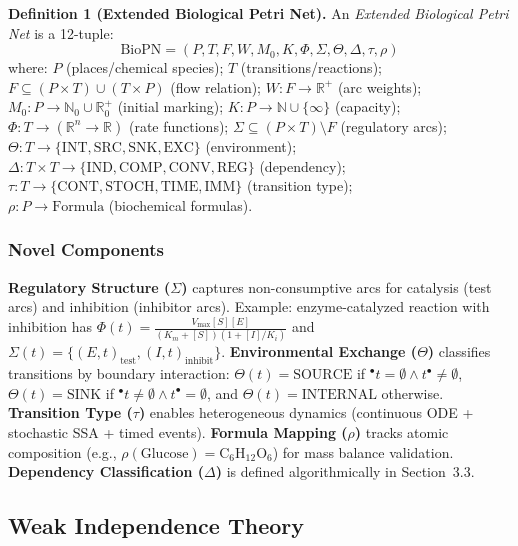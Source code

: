 \documentclass[twocolumn,11pt]{article}
\newcommand{\preset}[1]{\ensuremath{{}^{\bullet}#1}}
\newcommand{\postset}[1]{\ensuremath{#1^{\bullet}}}
\begin{document}
{\small
\textbf{Definition 1 (Extended Biological Petri Net).}
An \emph{Extended Biological Petri Net} is a 12-tuple:
\begin{equation}
\text{BioPN} = (P, T, F, W, M_0, K, \Phi, \Sigma, \Theta, \Delta, \tau, \rho)
\end{equation}
where: $P$ (places/chemical species); $T$ (transitions/reactions); $F \subseteq (P \times T) \cup (T \times P)$ (flow relation); $W: F \to \mathbb{R}^+$ (arc weights); $M_0: P \to \mathbb{N}_0 \cup \mathbb{R}_0^+$ (initial marking); $K: P \to \mathbb{N} \cup \{\infty\}$ (capacity); $\Phi: T \to (\mathbb{R}^n \to \mathbb{R})$ (rate functions); $\Sigma \subseteq (P \times T) \setminus F$ (regulatory arcs); \\
$\Theta: T \to \{\text{INT}, \text{SRC}, \text{SNK}, \text{EXC}\}$ (environment); \\
$\Delta: T \times T \to \{\text{IND}, \text{COMP}, \text{CONV}, \text{REG}\}$ (dependency); \\
$\tau: T \to \{\text{CONT}, \text{STOCH}, \text{TIME}, \text{IMM}\}$ (transition type); \\
$\rho: P \to \text{Formula}$ (biochemical formulas).
}

\subsubsection{Novel Components}
\textbf{Regulatory Structure ($\Sigma$)} captures non-consumptive arcs for catalysis (test arcs) and inhibition (inhibitor arcs). Example: enzyme-catalyzed reaction with inhibition has $\Phi(t) = \frac{V_{\max} [S] [E]}{(K_m + [S])(1 + [I]/K_i)}$ and $\Sigma(t) = \{(E,t)_{\text{test}}, (I,t)_{\text{inhibit}}\}$.
\textbf{Environmental Exchange ($\Theta$)} classifies transitions by boundary interaction: $\Theta(t) = \text{SOURCE}$ if $\preset{t} = \emptyset \land \postset{t} \neq \emptyset$, $\Theta(t) = \text{SINK}$ if $\preset{t} \neq \emptyset \land \postset{t} = \emptyset$, and $\Theta(t) = \text{INTERNAL}$ otherwise.
\textbf{Transition Type ($\tau$)} enables heterogeneous dynamics (continuous ODE + stochastic SSA + timed events).
\textbf{Formula Mapping ($\rho$)} tracks atomic composition (e.g., $\rho(\text{Glucose}) = \text{C}_6\text{H}_{12}\text{O}_6$) for mass balance validation.
\textbf{Dependency Classification ($\Delta$)} is defined algorithmically in Section~3.3.

\subsection{Weak Independence Theory}
\end{document}
